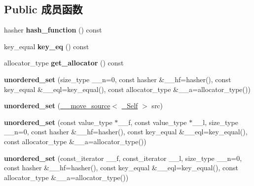 \subsection*{Public 成员函数}
\begin{DoxyCompactItemize}
\item 
\mbox{\label{classunordered__set_aeace104331df065f30dc5554c1274dcd}} 
hasher {\bfseries hash\+\_\+function} () const
\item 
\mbox{\label{classunordered__set_ac3a80e1eee6587fc181afaace02218e4}} 
key\+\_\+equal {\bfseries key\+\_\+eq} () const
\item 
\mbox{\label{classunordered__set_a266f592162f2f08c3c6595749846691a}} 
allocator\+\_\+type {\bfseries get\+\_\+allocator} () const
\item 
\mbox{\label{classunordered__set_a11d7755d39487d6db65564ac6d6f42df}} 
{\bfseries unordered\+\_\+set} (size\+\_\+type \+\_\+\+\_\+n=0, const hasher \&\+\_\+\+\_\+hf=hasher(), const key\+\_\+equal \&\+\_\+\+\_\+eql=key\+\_\+equal(), const allocator\+\_\+type \&\+\_\+\+\_\+a=allocator\+\_\+type())
\item 
\mbox{\label{classunordered__set_a1dcf17502dd1e5950311af2a1b948c3b}} 
{\bfseries unordered\+\_\+set} (\hyperlink{class____move__source}{\+\_\+\+\_\+move\+\_\+source}$<$ \hyperlink{classunordered__set}{\+\_\+\+Self} $>$ src)
\item 
\mbox{\label{classunordered__set_a494494f3184f48806b01dcda62388e80}} 
{\bfseries unordered\+\_\+set} (const value\+\_\+type $\ast$\+\_\+\+\_\+f, const value\+\_\+type $\ast$\+\_\+\+\_\+l, size\+\_\+type \+\_\+\+\_\+n=0, const hasher \&\+\_\+\+\_\+hf=hasher(), const key\+\_\+equal \&\+\_\+\+\_\+eql=key\+\_\+equal(), const allocator\+\_\+type \&\+\_\+\+\_\+a=allocator\+\_\+type())
\item 
\mbox{\label{classunordered__set_ac32fdd6f39252e8be1a67f2ea28f26eb}} 
{\bfseries unordered\+\_\+set} (const\+\_\+iterator \+\_\+\+\_\+f, const\+\_\+iterator \+\_\+\+\_\+l, size\+\_\+type \+\_\+\+\_\+n=0, const hasher \&\+\_\+\+\_\+hf=hasher(), const key\+\_\+equal \&\+\_\+\+\_\+eql=key\+\_\+equal(), const allocator\+\_\+type \&\+\_\+\+\_\+a=allocator\+\_\+type())

\end{DoxyCompactItemize}
